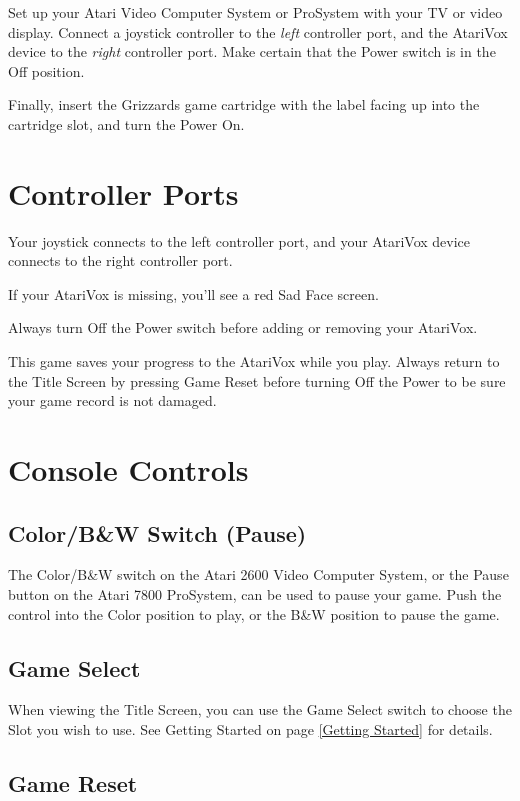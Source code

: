 \documentclass[10pt,twoside,openright]{memoir}
\begin{document}
Set up your  Atari Video Computer System or ProSystem  with your TV or
video  display.  Connect  a  joystick controller  to  the  \emph{left}
controller  port,   and  the  AtariVox  device   to  the  \emph{right}
controller port.  Make certain  that the  Power switch  is in  the Off
position.

Finally, insert the Grizzards game cartridge with the
label facing up into the cartridge slot, and turn the Power On.

\section{Controller Ports}

Your joystick  connects to the  left controller port, and  your AtariVox
device connects to the right controller port.

If your AtariVox is missing, you'll see a red Sad Face screen.

Always   turn  Off   the  Power   switch  before   adding  or   removing
your AtariVox.

This  game  saves  your  progress   to  the  AtariVox  while  you  play.
Always return to the Title Screen  by pressing Game Reset before turning
Off the Power to be sure your game record is not damaged.

\section{Console Controls}

\subsection{Color/B\&W Switch (Pause)}

The Color/B\&W switch on the Atari  2600 Video Computer System, or the
Pause button  on the Atari 7800  ProSystem, can be used  to pause your
game. Push  the control into the  Color position to play,  or the B\&W
position to pause the game.

\subsection{Game Select}

When viewing the Title Screen, you can use the Game Select switch to
choose the Slot you wish to use.  See Getting Started on page
\ref{Getting Started} for details.

\subsection{Game Reset}
\end{document}
